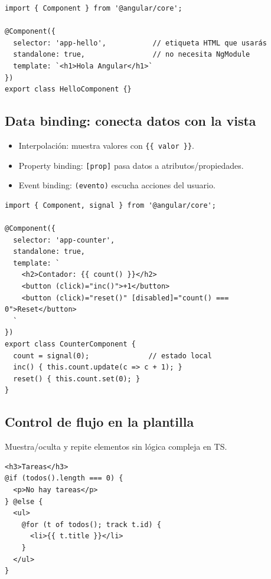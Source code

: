 \documentclass[11pt,a4paper]{article}
\begin{document}
\begin{lstlisting}[style=tsstyle, caption={Componente mínimo standalone}]
import { Component } from '@angular/core';

@Component({
  selector: 'app-hello',           // etiqueta HTML que usarás
  standalone: true,                // no necesita NgModule
  template: `<h1>Hola Angular</h1>`
})
export class HelloComponent {}
\end{lstlisting}

\subsection{Data binding: conecta datos con la vista}
\begin{itemize}[leftmargin=*]
  \item Interpolación: muestra valores con \texttt{{\{}\{ valor \}\}}.
  \item Property binding: \texttt{[prop]} pasa datos a atributos/propiedades.
  \item Event binding: \texttt{(evento)} escucha acciones del usuario.
\end{itemize}

\begin{lstlisting}[style=tsstyle, caption={Estado local sencillo con Signals}]
import { Component, signal } from '@angular/core';

@Component({
  selector: 'app-counter',
  standalone: true,
  template: `
    <h2>Contador: {{ count() }}</h2>
    <button (click)="inc()">+1</button>
    <button (click)="reset()" [disabled]="count() === 0">Reset</button>
  `
})
export class CounterComponent {
  count = signal(0);              // estado local
  inc() { this.count.update(c => c + 1); }
  reset() { this.count.set(0); }
}
\end{lstlisting}

\subsection{Control de flujo en la plantilla}
Muestra/oculta y repite elementos sin lógica compleja en TS.
\begin{lstlisting}[style=htmlstyle, caption={@if y @for con trackBy básico}]
<h3>Tareas</h3>
@if (todos().length === 0) {
  <p>No hay tareas</p>
} @else {
  <ul>
    @for (t of todos(); track t.id) {
      <li>{{ t.title }}</li>
    }
  </ul>
}
\end{lstlisting}
\end{document}
